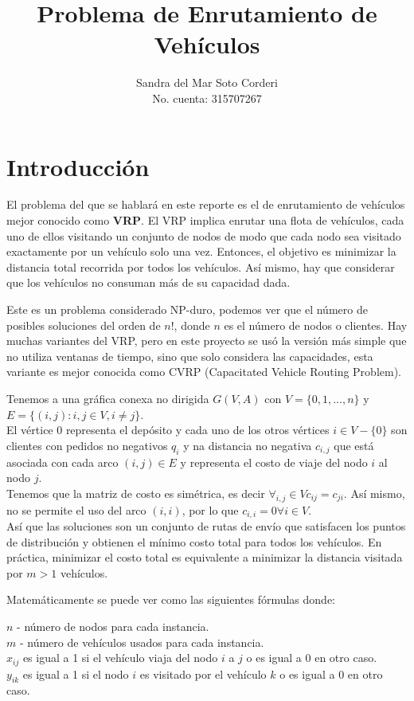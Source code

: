 \documentclass{article}
\title{Problema de Enrutamiento de Veh\'iculos}
\author{
  Sandra del Mar Soto Corderi\\
  No. cuenta: 315707267
}
\date{}
\begin{document}
\maketitle

\section{Introducción}

El problema del que se hablará en este reporte es el de enrutamiento de vehículos mejor conocido como \textbf{VRP}. El VRP implica enrutar una flota de vehículos, cada uno de ellos visitando un conjunto de nodos de modo que cada nodo sea visitado exactamente por un vehículo solo una vez. Entonces, el objetivo es minimizar la distancia total recorrida por todos los vehículos. Así mismo, hay que considerar que los vehículos no consuman más de su capacidad dada.

Este es un problema considerado NP-duro, podemos ver que el número de posibles soluciones del orden de $n!$, donde $n$ es el número de nodos o clientes. Hay muchas variantes del VRP, pero en este proyecto se usó la versión más simple que no utiliza ventanas de tiempo, sino que solo considera las capacidades, esta variante es mejor conocida como CVRP (Capacitated Vehicle Routing Problem).

Tenemos a una gráfica conexa no dirigida $G(V,A)$ con $V = \{0,1,...,n\}$ y $E=\{(i,j): i,j \in V, i\neq j \}$.\\ 
El vértice 0 representa el depósito y cada uno de los otros vértices $i \in V - \{0\}$ son clientes con pedidos no negativos $q_i$ y na distancia no negativa $c_{i,j}$ que está asociada con cada arco $(i,j) \in E$ y representa el costo de viaje del nodo $i$ al nodo $j$.\\
Tenemos que la matriz de costo es simétrica, es decir $\forall_{i,j} \in V c_{ij} = c_{ji}$. Así mismo, no se permite el uso del arco $(i,i)$, por lo que $c_{i,i} = 0 \forall i \in V$.\\
Así que las soluciones son un conjunto de rutas de envío que satisfacen los puntos de distribución y obtienen el mínimo costo total para todos los vehículos. En práctica, minimizar el costo total es equivalente a minimizar la distancia visitada por $m > 1$ vehículos.

Matemáticamente se puede ver como las siguientes fórmulas donde:

$n$ - número de nodos para cada instancia.\\
$m$ - número de vehículos usados para cada instancia.\\
$x_{ij}$ es igual a 1 si el vehículo viaja del nodo $i$ a $j$ o es igual a 0 en otro caso.\\
$y_{ik}$ es igual a 1 si el nodo $i$ es visitado por el vehículo $k$ o es igual a 0 en otro caso.\\
\end{document}

